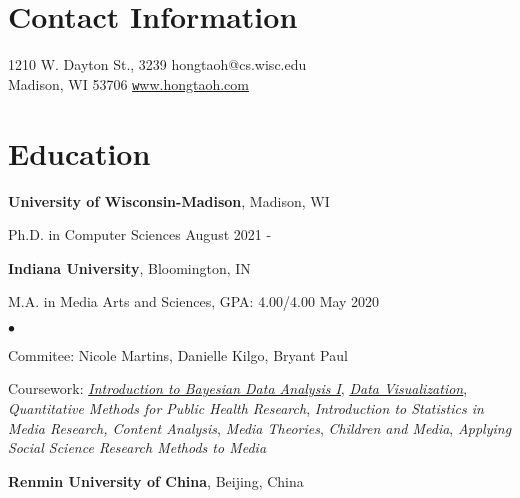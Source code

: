 \documentclass[margin,line, 10pt]{res}
\newenvironment{list2}{
  \begin{list}{$\bullet$}{%
      \setlength{\itemsep}{0in}
      \setlength{\parsep}{0in} \setlength{\parskip}{0in}
      \setlength{\topsep}{0in} \setlength{\partopsep}{0in} 
      \setlength{\leftmargin}{0.2in}}}{\end{list}}
\begin{document}

\begin{resume}
\section{\sc Contact Information}
1210 W. Dayton St., 3239 \hfill {hongtaoh@cs.wisc.edu}\\
Madison, WI 53706 \hfill \href{https://hongtaoh.com/}{\texttt www.hongtaoh.com}


\section{\sc Education}
{\bf University of Wisconsin-Madison}, Madison, WI

\vspace{-0.4cm}
Ph.D. in Computer Sciences \hfill {August 2021 - }

{\bf Indiana University}, Bloomington, IN

\vspace{-0.4cm}
M.A. in Media Arts and Sciences, GPA: 4.00/4.00 \hfill {May 2020}\\

\begin{list2}
\vspace*{-0.3cm}

\item Commitee: Nicole Martins, Danielle Kilgo, Bryant Paul
\item Coursework: \href{https://jkkweb.sitehost.iu.edu/jkkteach/P533/}{\emph{Introduction to Bayesian Data Analysis I}}, \href{http://yyahn.com/dviz-course/}{\emph{Data Visualization}}, \emph{Quantitative Methods for Public Health Research},  \emph{Introduction to Statistics in Media Research, Content Analysis},  \emph{Media Theories},  \emph{Children and Media},  \emph{Applying Social Science Research Methods to Media}
\end{list2}

{\bf Renmin University of China}, Beijing, China


\end{resume}
\end{document}
